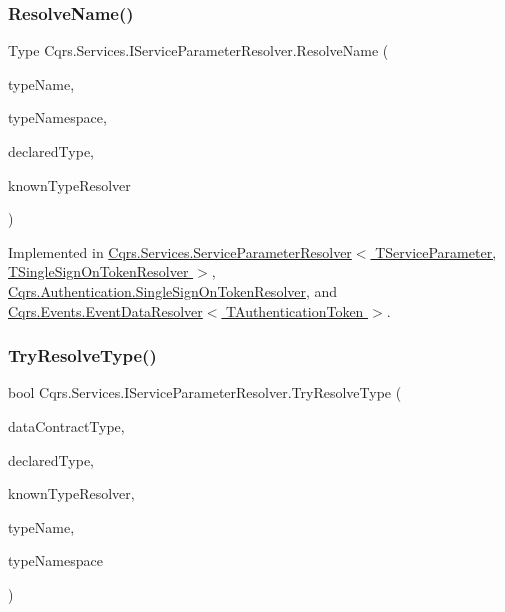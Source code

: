 \subsubsection{\texorpdfstring{Resolve\+Name()}{ResolveName()}}
{\footnotesize\ttfamily Type Cqrs.\+Services.\+I\+Service\+Parameter\+Resolver.\+Resolve\+Name (\begin{DoxyParamCaption}\item[{string}]{type\+Name,  }\item[{string}]{type\+Namespace,  }\item[{Type}]{declared\+Type,  }\item[{Data\+Contract\+Resolver}]{known\+Type\+Resolver }\end{DoxyParamCaption})}



Implemented in \hyperlink{classCqrs_1_1Services_1_1ServiceParameterResolver_a1c668ecde242b87faa85a3dc89d5d974_a1c668ecde242b87faa85a3dc89d5d974}{Cqrs.\+Services.\+Service\+Parameter\+Resolver$<$ T\+Service\+Parameter, T\+Single\+Sign\+On\+Token\+Resolver $>$}, \hyperlink{classCqrs_1_1Authentication_1_1SingleSignOnTokenResolver_abd546dcdabb00db2e8d0288cbe373895_abd546dcdabb00db2e8d0288cbe373895}{Cqrs.\+Authentication.\+Single\+Sign\+On\+Token\+Resolver}, and \hyperlink{classCqrs_1_1Events_1_1EventDataResolver_ade34415acd009dd3f9f3a43169da43e9_ade34415acd009dd3f9f3a43169da43e9}{Cqrs.\+Events.\+Event\+Data\+Resolver$<$ T\+Authentication\+Token $>$}.

\mbox{\label{interfaceCqrs_1_1Services_1_1IServiceParameterResolver_a31c82a00b192b877faff6df99e1b689b_a31c82a00b192b877faff6df99e1b689b}} 
\subsubsection{\texorpdfstring{Try\+Resolve\+Type()}{TryResolveType()}}
{\footnotesize\ttfamily bool Cqrs.\+Services.\+I\+Service\+Parameter\+Resolver.\+Try\+Resolve\+Type (\begin{DoxyParamCaption}\item[{Type}]{data\+Contract\+Type,  }\item[{Type}]{declared\+Type,  }\item[{Data\+Contract\+Resolver}]{known\+Type\+Resolver,  }\item[{out Xml\+Dictionary\+String}]{type\+Name,  }\item[{out Xml\+Dictionary\+String}]{type\+Namespace }\end{DoxyParamCaption})}



